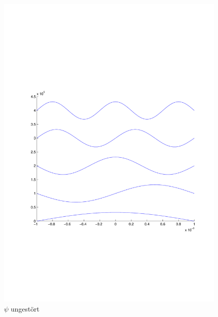 \begin{refsection}
\begin{figure}
 \centering
 \includegraphics[width=12cm]{efeld/Psi_ungestoert.pdf}
 \caption{$\psi$ ungest\"ort}
 \label{abb:efeld_psi_ungestoert}
\end{figure}


\end{refsection}
